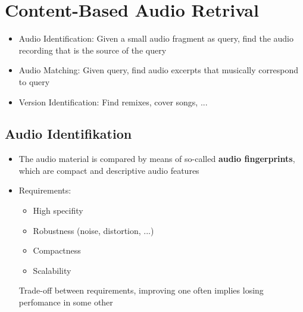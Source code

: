 \documentclass{scrartcl}
\begin{document}
\newpage

\section{Content-Based Audio Retrival}
\begin{itemize}
    \item
        Audio Identification: Given a small audio fragment as query, find the audio recording that is the source of the query
    \item
        Audio Matching: Given query, find audio excerpts that musically correspond to query
    \item
        Version Identification: Find remixes, cover songs, ...

\end{itemize}
\subsection*{Audio Identifikation}
\begin{itemize}
    \item
        The audio material is compared by means of so-called \textbf{audio fingerprints}, which are compact and descriptive audio features
    \item
        Requirements:
        \begin{itemize}
            \item
                High specifity
            \item
                Robustness (noise, distortion, ...)
            \item
                Compactness
            \item
                Scalability
        \end{itemize}
        Trade-off between requirements, improving one often implies losing perfomance in some other
\end{itemize}
\end{document}
